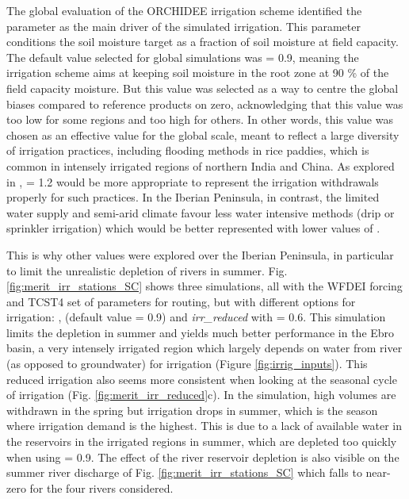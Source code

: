 \hfill

The global evaluation of the ORCHIDEE irrigation scheme \citep{arboleda-obando_validation_2024} identified the \betairrig parameter as the main driver of the simulated irrigation. This parameter conditions the soil moisture target as a fraction of soil moisture at field capacity. The default value selected for global simulations was \betairrig = 0.9, meaning the irrigation scheme aims at keeping soil moisture in the root zone at 90 \% of the field capacity moisture. But this value was selected as a way to centre the global biases compared to reference products on zero, acknowledging that this value was too low for some regions and too high for others. In other words, this \betairrig value was chosen as an effective value for the global scale, meant to reflect a large diversity of irrigation practices, including flooding methods in rice paddies, which is common in intensely irrigated regions of northern India and China. As explored in \citet{arboleda-obando_validation_2024}, \betairrig = 1.2 would be more appropriate to represent the irrigation withdrawals properly for such practices. In the Iberian Peninsula, in contrast, the limited water supply and semi-arid climate favour less water intensive methods (drip or sprinkler irrigation) which would be better represented with lower values of \betairrig. 

This is why other values were explored over the Iberian Peninsula, in particular to limit the unrealistic depletion of rivers in summer. Fig. \ref{fig:merit_irr_stations_SC} shows three simulations, all with the WFDEI forcing and TCST4 set of parameters for routing, but with different options for irrigation: \noirr, \irr (default value \betairrig = 0.9) and \textit{irr\_reduced} with \betairrig = 0.6. 
This simulation limits the depletion in summer and yields much better performance in the Ebro basin, a very intensely irrigated region which largely depends on water from river (as opposed to groundwater) for irrigation (Figure \ref{fig:irrig_inputs}).
This reduced irrigation also seems more consistent when looking at the seasonal cycle of irrigation (Fig. \ref{fig:merit_irr_reduced}c). In the \irr simulation, high volumes are withdrawn in the spring but irrigation drops in summer, which is the season where irrigation demand is the highest. This is due to a lack of available water in the reservoirs in the irrigated regions in summer, which are depleted too quickly when using \betairrig = 0.9. The effect of the river reservoir depletion is also visible on the summer river discharge of Fig. \ref{fig:merit_irr_stations_SC} which falls to near-zero for the four rivers considered. 

